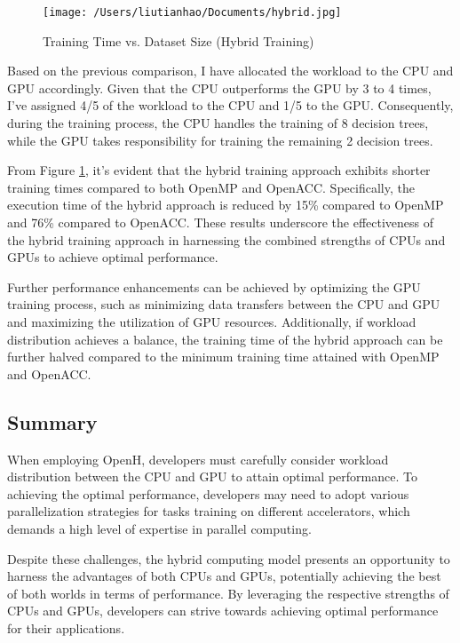 \documentclass[13pt]{article}
\begin{document}
\begin{figure}[ht]
    \centering
    \texttt{[image: /Users/liutianhao/Documents/hybrid.jpg]}
    \caption{Training Time vs. Dataset Size (Hybrid Training)}
    \label{fig:dataset2}    
\end{figure}

Based on the previous comparison, I have allocated the workload to the CPU and GPU accordingly. Given that the CPU outperforms the GPU by 3 to 4 times, I've assigned 4/5 of the workload to the CPU and 1/5 to the GPU. Consequently, during the training process, the CPU handles the training of 8 decision trees, while the GPU takes responsibility for training the remaining 2 decision trees.

From Figure \ref{fig:dataset2}, it's evident that the hybrid training approach exhibits shorter training times compared to both OpenMP and OpenACC. Specifically, the execution time of the hybrid approach is reduced by 15\% compared to OpenMP and 76\% compared to OpenACC. These results underscore the effectiveness of the hybrid training approach in harnessing the combined strengths of CPUs and GPUs to achieve optimal performance.

Further performance enhancements can be achieved by optimizing the GPU training process, such as minimizing data transfers between the CPU and GPU and maximizing the utilization of GPU resources. Additionally, if workload distribution achieves a balance, the training time of the hybrid approach can be further halved compared to the minimum training time attained with OpenMP and OpenACC.

\subsection{Summary}
When employing OpenH, developers must carefully consider workload distribution between the CPU and GPU to attain optimal performance. To achieving the optimal performance, developers may need to adopt various parallelization strategies for tasks training on different accelerators, which demands a high level of expertise in parallel computing. 

Despite these challenges, the hybrid computing model presents an opportunity to harness the advantages of both CPUs and GPUs, potentially achieving the best of both worlds in terms of performance. By leveraging the respective strengths of CPUs and GPUs, developers can strive towards achieving optimal performance for their applications.
\end{document}
